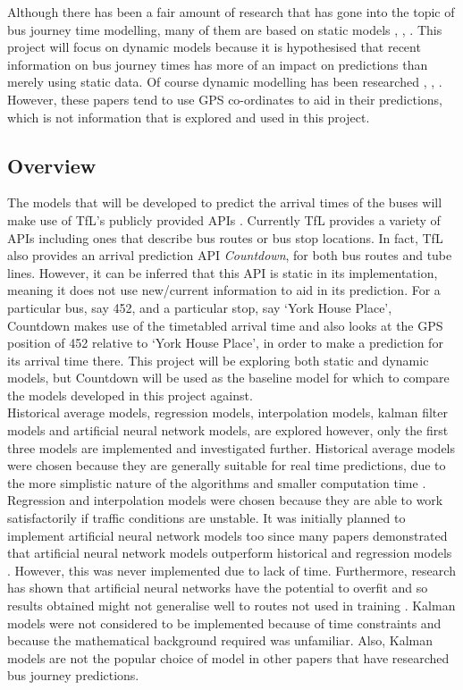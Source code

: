 Although there has been a fair amount of research that has gone into the topic of bus journey time modelling, many of them are based on static models \cite{ann-prediction}, \cite{weather-transport-effect}, \cite{google-machine-learning}. This project will focus on dynamic models because it is hypothesised that recent information on bus journey times has more of an impact on predictions than merely using static data. Of course dynamic modelling has been researched \cite{traffic-modelling-article}, \cite{dynamic-gps}, \cite{smart-public-transport}. However, these papers tend to use GPS co-ordinates to aid in their predictions, which is not information that is explored and used in this project.

\subsection{Overview}

The models that will be developed to predict the arrival times of the buses will make use of TfL's publicly provided APIs \cite{tfl-api}. Currently TfL provides a variety of APIs including ones that describe bus routes or bus stop locations. In fact, TfL also provides an arrival prediction API \textit{Countdown}, for both bus routes and tube lines. However, it can be inferred that this API is static in its implementation, meaning it does not use new/current information to aid in its prediction. For a particular bus, say 452, and a particular stop, say `York House Place', Countdown makes use of the timetabled arrival time and also looks at the GPS position of 452 relative to `York House Place', in order to make a prediction for its arrival time there. This project will be exploring both static and dynamic models, but Countdown will be used as the baseline model for which to compare the models developed in this project against. \\

Historical average models, regression models, interpolation models, kalman filter models and artificial neural network models, are explored however, only the first three models are implemented and investigated further. Historical average models were chosen because they are generally suitable for real time predictions, due to the more simplistic nature of the algorithms and smaller computation time \cite{dynamic-gps}. Regression and interpolation models were chosen because they are able to work satisfactorily if traffic conditions are unstable. It was initially planned to implement artificial neural network models too since many papers demonstrated that artificial neural network models outperform historical and regression models \cite{ann-prediction}. However, this was never implemented due to lack of time. Furthermore, research has shown that artificial neural networks have the potential to overfit and so results obtained might not generalise well to routes not used in training \cite{dynamic-gps}. Kalman models were not considered to be implemented because of time constraints and because the mathematical background required was unfamiliar. Also, Kalman models are not the popular choice of model in other papers that have researched bus journey predictions. \\

